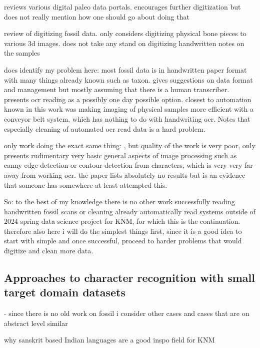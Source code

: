 \documentclass{article}
\begin{document}
\cite{uhenCardCatalogsComputers2013} reviews various digital paleo data portals. encourages further digitization but 
does not really mention how one should go about doing that

\cite{mallisonDigitizingMethodsPaleontology2011} review of digitizing fossil data. only considers digitizing 
physical bone pieces to various 3d images. does not take any stand on digitizing handwritten notes on the samples 

\cite{groomImprovedStandardizationTranscribed2019} does identify my problem here: most fossil data is in handwritten paper 
format with many things already known such as taxon. gives suggestions on data format and management but mostly assuming 
that there is a human transcriber. presents ocr reading as a possibly one day possible option. closest to automation 
known in this work was making imaging of physical samples more efficient with a conveyor belt system, which has nothing to 
do with handwriting ocr. Notes that especially cleaning of automated ocr read data is a hard problem.

only work doing the exact same thing: \cite{shanmugavelHandwrittenOpticalCharacter2018}, but quality of the work is very poor, only 
presents rudimentary very basic general aspects of image processing such as canny edge detection or contour detection from characters, 
which is very very far away from working ocr. the paper lists absolutely no results but is an evidence that someone has somewhere at least 
attempted this.

So: to the best of my knowledge there is no other work successfully reading handwritten fossil scans or cleaning 
already automatically read systems outside of 2024 spring data science project for KNM, for which this is the 
continuation. therefore also here i will do the simplest things first, since it is a good idea to start with simple and 
once successful, proceed to harder problems that would digitize and clean more data.

\subsection{Approaches to character recognition with small target domain datasets}

- since there is no old work on fossil i consider other cases and cases that are on abstract level similar


why sanskrit based Indian languages are a good inspo field for KNM
\end{document}
